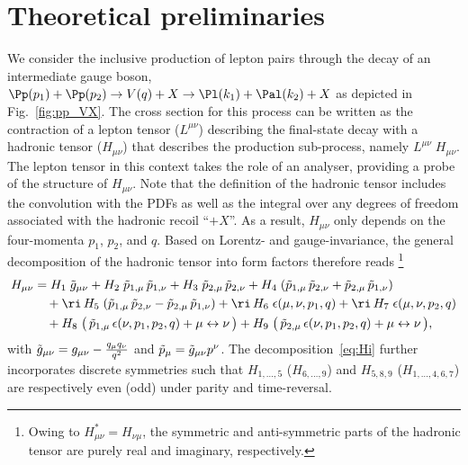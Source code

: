 
\section{Theoretical preliminaries}
\label{sec2}

We consider the inclusive production of lepton pairs through the decay of an intermediate gauge boson, $\Pp(p_1) + \Pp(p_2) \to V(q) + X \to \Pl(k_1) + \Pal(k_2) + X$ as depicted in Fig.~\ref{fig:pp_VX}.
The cross section for this process can be written as the contraction of a lepton tensor ($L^{\mu\nu}$) describing the final-state decay with a hadronic tensor ($H_{\mu\nu}$) that describes the production sub-process, namely $L^{\mu\nu} \; H_{\mu\nu}$.
The lepton tensor in this context takes the role of an analyser, providing a probe of the structure of $H_{\mu\nu}$.
Note that the definition of the hadronic tensor includes the convolution with the PDFs as well as the integral over 
any degrees of freedom associated with the hadronic recoil ``$+X$''. 
As a result, $H_{\mu\nu}$ only depends on the four-momenta $p_1$, $p_2$, and $q$. 
Based on Lorentz- and gauge-invariance, the general decomposition of the hadronic tensor into form factors therefore reads%
\footnote{Owing to $H_{\mu\nu}^* = H_{\nu\mu}$, the symmetric and anti-symmetric parts of the hadronic tensor are purely real and imaginary, respectively.}
\begin{align}
  H_{\mu\nu} &=
  H_1 \; \tg_{\mu\nu} %
  + H_2 \; \tp_{1,\mu} \, \tp_{1,\nu} %
  + H_3 \; \tp_{2,\mu} \, \tp_{2,\nu} %
  + H_4 \; ( \tp_{1,\mu} \, \tp_{2,\nu} + \tp_{2,\mu} \, \tp_{1,\nu} ) \nonumber \\ &\quad 
  + \ri\, H_5 \; ( \tp_{1,\mu} \, \tp_{2,\nu} - \tp_{2,\mu} \, \tp_{1,\nu} ) %
  + \ri\, H_6 \; \epsilon(\mu, \nu, p_1, q) %
  + \ri\, H_7 \; \epsilon(\mu, \nu, p_2, q) \nonumber \\ &\quad 
  + H_8 \; \bigl(\, \tp_{1,\mu} \, \epsilon(\nu, p_1, p_2, q) + \mu \leftrightarrow \nu \,\bigr) %
  + H_9 \; \bigl(\, \tp_{2,\mu} \, \epsilon(\nu, p_1, p_2, q) + \mu \leftrightarrow \nu \,\bigr) ,
  \label{eq:Hi}
\end{align}
with $\tilde{g}_{\mu\nu} = g_{\mu\nu} - \frac{q_\mu q_\nu}{q^2}$ and $\tilde{p}_\mu = \tilde{g}_{\mu\nu} p^\nu$.
The decomposition~\eqref{eq:Hi} further incorporates discrete symmetries such that $H_{1,\ldots,5}$ ($H_{6,\ldots,9}$) and $H_{5,8,9}$ ($H_{1,\ldots,4,6,7}$) are respectively even (odd) under parity and time-reversal.

